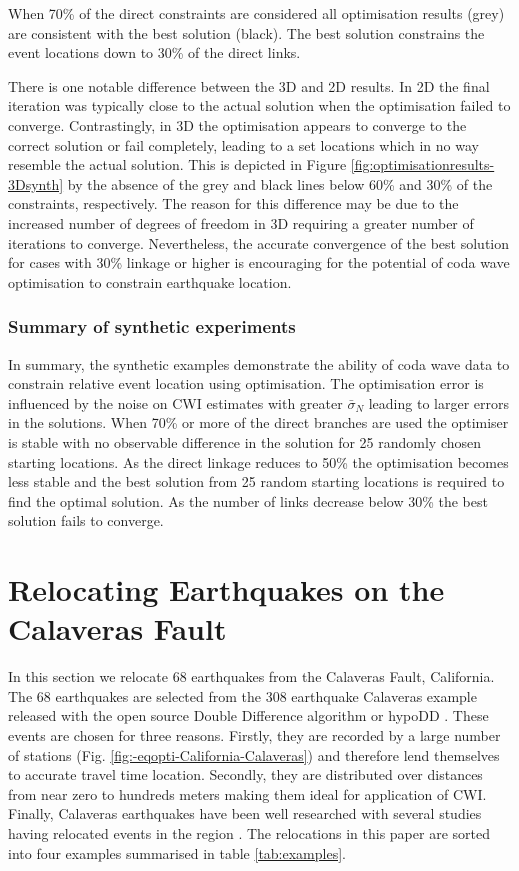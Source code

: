 \documentclass[extra]{gji}
\begin{document}
When 70\% of the direct constraints are considered all optimisation
results (grey) are consistent with the best solution (black). The
best solution constrains the event locations down to 30\% of the
direct links.

There is one notable difference between the 3D and 2D results. In 2D
the final iteration was typically close to the actual solution when
the optimisation failed to converge.
Contrastingly, in 3D the optimisation appears to converge to the
correct solution or fail completely, leading to a set locations
which in no way resemble the actual solution. This is depicted in
Figure \ref{fig:optimisationresults-3Dsynth} by the absence of the
grey and black lines below 60\% and 30\% of the constraints,
respectively. The reason for this difference may be due to the
increased number of degrees of freedom in 3D requiring a greater
number of iterations to converge. Nevertheless, the accurate
convergence of the best solution for cases with 30\% linkage or
higher is encouraging for the potential of coda wave optimisation to
constrain earthquake location.

\subsubsection{Summary of synthetic experiments}

In summary, the synthetic examples demonstrate the ability of coda
wave data to constrain relative event location using optimisation.
The optimisation error is influenced by the noise on CWI estimates
with greater $\bar{\sigma}_N$ leading to larger errors in the
solutions. When 70\% or more of the direct branches are used the
optimiser is stable with no observable difference in the solution
for 25 randomly chosen starting locations. As the direct linkage
reduces to 50\% the optimisation becomes less stable and the best
solution from 25 random starting locations is required to find the
optimal solution. As the number of links decrease below
30\% the best solution fails to converge.


\section{Relocating Earthquakes on the Calaveras Fault}
\label{sec:CalaverasLoc-CWIonly}

In this section we relocate 68 earthquakes from the Calaveras Fault,
California. The 68 earthquakes are selected from the 308 earthquake
Calaveras example released with the open source Double Difference
algorithm or hypoDD \citep{dr_Waldhauser00a,dr_Waldhauser01a}. These
events are chosen for three reasons. Firstly, they are recorded by a
large number of stations (Fig.
\ref{fig:-eqopti-California-Calaveras}) and therefore lend
themselves to accurate travel time location. Secondly, they are
distributed over distances from near zero to hundreds
meters making them ideal for application of CWI. Finally, Calaveras
earthquakes have been well researched with several studies having
relocated events in the region \citep{dr_Waldhauser01a,
dr_Schaff02a, dr_Waldhauser08a}. The relocations in this paper are
sorted into four examples summarised in table \ref{tab:examples}.
\end{document}
